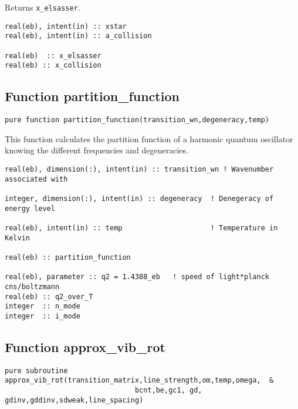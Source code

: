 Returns \verb=x_elsasser=.

\begin{lstlisting}
real(eb), intent(in) :: xstar
real(eb), intent(in) :: a_collision

real(eb)  :: x_elsasser
real(eb) :: x_collision
\end{lstlisting}

\subsection{Function partition\_function}

\begin{lstlisting}
pure function partition_function(transition_wn,degeneracy,temp)
\end{lstlisting}

This function calculates the partition function of a harmonic quantum oscillator knowing the different frequencies and degeneracies.

\begin{lstlisting}
real(eb), dimension(:), intent(in) :: transition_wn ! Wavenumber associated with

integer, dimension(:), intent(in) :: degeneracy  ! Denegeracy of energy level

real(eb), intent(in) :: temp                     ! Temperature in Kelvin

real(eb) :: partition_function

real(eb), parameter :: q2 = 1.4388_eb   ! speed of light*planck cns/boltzmann
real(eb) :: q2_over_T
integer  :: n_mode
integer  :: i_mode
\end{lstlisting}


\subsection{Function approx\_vib\_rot}

\begin{lstlisting}
pure subroutine approx_vib_rot(transition_matrix,line_strength,om,temp,omega,  &
                               bcnt,be,gc1, gd, gdinv,gddinv,sdweak,line_spacing)
\end{lstlisting}

